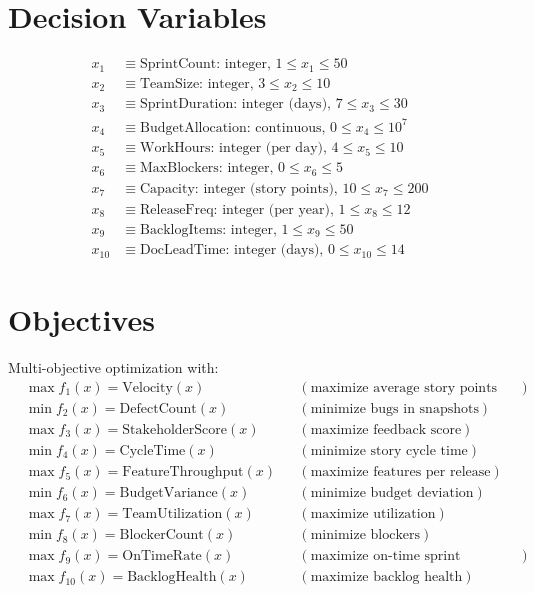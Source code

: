 \documentclass{article}
\begin{document}
\section*{Decision Variables}
\[
\begin{aligned}
x_1 &\equiv \text{SprintCount: integer, }1 \le x_1 \le 50\\
x_2 &\equiv \text{TeamSize: integer, }3 \le x_2 \le 10\\
x_3 &\equiv \text{SprintDuration: integer (days), }7 \le x_3 \le 30\\
x_4 &\equiv \text{BudgetAllocation: continuous, }0 \le x_4 \le 10^7\\
x_5 &\equiv \text{WorkHours: integer (per day), }4 \le x_5 \le 10\\
x_6 &\equiv \text{MaxBlockers: integer, }0 \le x_6 \le 5\\
x_7 &\equiv \text{Capacity: integer (story points), }10 \le x_7 \le 200\\
x_8 &\equiv \text{ReleaseFreq: integer (per year), }1 \le x_8 \le 12\\
x_9 &\equiv \text{BacklogItems: integer, }1 \le x_9 \le 50\\
x_{10} &\equiv \text{DocLeadTime: integer (days), }0 \le x_{10} \le 14
\end{aligned}
\]

\section*{Objectives}
Multi-objective optimization with:
\[
\begin{aligned}
&\max f_1(x) = \text{Velocity}(x) &&(\text{maximize average story points per sprint})\\
&\min f_2(x) = \text{DefectCount}(x) &&(\text{minimize bugs in snapshots})\\
&\max f_3(x) = \text{StakeholderScore}(x) &&(\text{maximize feedback score})\\
&\min f_4(x) = \text{CycleTime}(x) &&(\text{minimize story cycle time})\\
&\max f_5(x) = \text{FeatureThroughput}(x) &&(\text{maximize features per release})\\
&\min f_6(x) = \text{BudgetVariance}(x) &&(\text{minimize budget deviation})\\
&\max f_7(x) = \text{TeamUtilization}(x) &&(\text{maximize utilization})\\
&\min f_8(x) = \text{BlockerCount}(x) &&(\text{minimize blockers})\\
&\max f_9(x) = \text{OnTimeRate}(x) &&(\text{maximize on-time sprint completion})\\
&\max f_{10}(x) = \text{BacklogHealth}(x) &&(\text{maximize backlog health})
\end{aligned}
\]
\end{document}
